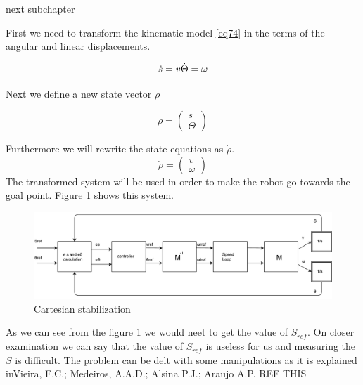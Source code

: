 {\color{red}next subchapter}

First we need to transform the kinematic model \ref{eq74} in the terms of the angular and linear displacements.

\begin{equation}
\dot{s}=v\\
\dot{\Theta}=\omega
\end{equation}

Next we define a new state vector $\rho$

\begin{equation}
\rho
=
\begin{pmatrix}
s\\
\Theta
\end{pmatrix}
\end{equation}

Furthermore we will rewrite the state equations as $\dot{\rho}$.
\begin{equation}
\dot{\rho}=
\begin{pmatrix}
v\\
\omega
\end{pmatrix}
\end{equation}
The transformed system will be used in order to make the robot go towards the goal point. Figure \ref{fig:cartesianstab} shows this system.

\begin{figure} 
\centering
 	\includegraphics[width=1\textwidth]{figures/cartesianstab.pdf}
	
	
	\caption{Cartesian stabilization} 
 	\label{fig:cartesianstab} 
\end{figure}

As we can see from the figure \ref{fig:cartesianstab} we would neet to get the value of $S_{ref}$. On closer examination we can say that the value of $S_{ref}$ is useless for us and measuring the $S$ is difficult. The problem can be delt with some manipulations as it is explained in{\color{red}Vieira, F.C.; Medeiros, A.A.D.; Alsina P.J.; Araujo A.P. REF THIS}

